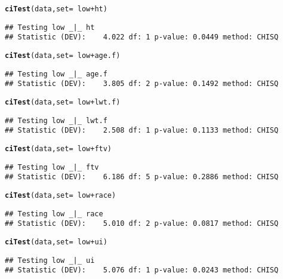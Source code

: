 \documentclass{article}\usepackage[]{graphicx}\usepackage[]{color}
\makeatletter
\newcommand{\hlopt}[1]{\textcolor[rgb]{0,0,0}{#1}}%
\newcommand{\hlstd}[1]{\textcolor[rgb]{0.345,0.345,0.345}{#1}}%
\newcommand{\hlkwc}[1]{\textcolor[rgb]{0.333,0.667,0.333}{#1}}%
\newcommand{\hlkwd}[1]{\textcolor[rgb]{0.737,0.353,0.396}{\textbf{#1}}}%
\newenvironment{kframe}{%
 \def\at@end@of@kframe{}%
 \ifinner\ifhmode%
  \def\at@end@of@kframe{\end{minipage}}%
  \begin{minipage}{\columnwidth}%
 \fi\fi%
 \def\FrameCommand##1{\hskip\@totalleftmargin \hskip-\fboxsep
 \colorbox{shadecolor}{##1}\hskip-\fboxsep
     \hskip-\linewidth \hskip-\@totalleftmargin \hskip\columnwidth}%
 \MakeFramed {\advance\hsize-\width
   \@totalleftmargin\z@ \linewidth\hsize
   \@setminipage}}%
 {\par\unskip\endMakeFramed%
 \at@end@of@kframe}
\newenvironment{knitrout}{}{} %
\makeatother
\begin{document}
\begin{knitrout}
\color{fgcolor}\begin{kframe}
\begin{alltt}
\hlkwd{ciTest}\hlstd{(data,}\hlkwc{set}\hlstd{=}\hlopt{~}\hlstd{low} \hlopt{+} \hlstd{ht)}
\end{alltt}
\begin{verbatim}
## Testing low _|_ ht 
## Statistic (DEV):    4.022 df: 1 p-value: 0.0449 method: CHISQ
\end{verbatim}
\begin{alltt}
\hlkwd{ciTest}\hlstd{(data,}\hlkwc{set}\hlstd{=}\hlopt{~}\hlstd{low} \hlopt{+} \hlstd{age.f)}
\end{alltt}
\begin{verbatim}
## Testing low _|_ age.f 
## Statistic (DEV):    3.805 df: 2 p-value: 0.1492 method: CHISQ
\end{verbatim}
\begin{alltt}
\hlkwd{ciTest}\hlstd{(data,}\hlkwc{set}\hlstd{=}\hlopt{~}\hlstd{low} \hlopt{+} \hlstd{lwt.f)}
\end{alltt}
\begin{verbatim}
## Testing low _|_ lwt.f 
## Statistic (DEV):    2.508 df: 1 p-value: 0.1133 method: CHISQ
\end{verbatim}
\begin{alltt}
\hlkwd{ciTest}\hlstd{(data,}\hlkwc{set}\hlstd{=}\hlopt{~}\hlstd{low} \hlopt{+} \hlstd{ftv)}
\end{alltt}
\begin{verbatim}
## Testing low _|_ ftv 
## Statistic (DEV):    6.186 df: 5 p-value: 0.2886 method: CHISQ
\end{verbatim}
\begin{alltt}
\hlkwd{ciTest}\hlstd{(data,}\hlkwc{set}\hlstd{=}\hlopt{~}\hlstd{low} \hlopt{+} \hlstd{race)}
\end{alltt}
\begin{verbatim}
## Testing low _|_ race 
## Statistic (DEV):    5.010 df: 2 p-value: 0.0817 method: CHISQ
\end{verbatim}
\begin{alltt}
\hlkwd{ciTest}\hlstd{(data,}\hlkwc{set}\hlstd{=}\hlopt{~}\hlstd{low} \hlopt{+} \hlstd{ui)}
\end{alltt}
\begin{verbatim}
## Testing low _|_ ui 
## Statistic (DEV):    5.076 df: 1 p-value: 0.0243 method: CHISQ
\end{verbatim}
\begin{alltt}

\end{alltt}
\end{kframe}
\end{knitrout}
\end{document}
